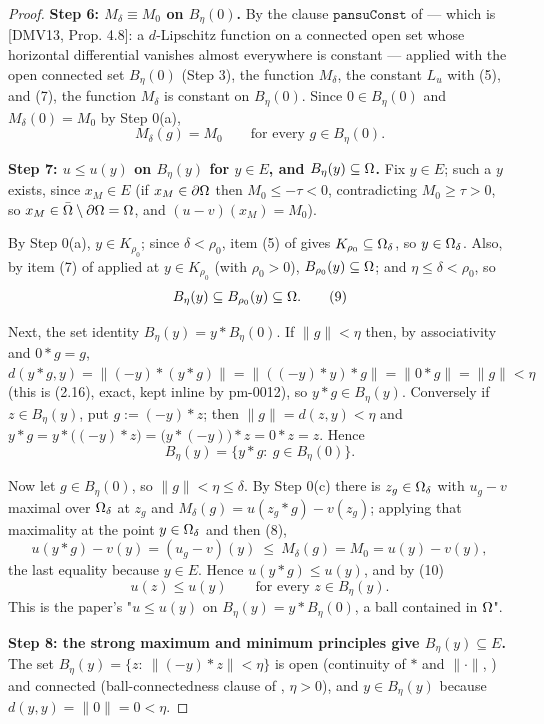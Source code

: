 \begin{proof}
\medskip\noindent\textbf{Step 6: $M_\delta\equiv M_0$ on $B_\eta(0)$.} By the clause
$\mathtt{pansuConst}$ of  --- which is [DMV13, Prop. 4.8]: a
$d$-Lipschitz function on a connected open set whose horizontal differential vanishes almost
everywhere is constant --- applied with the open connected set $B_\eta(0)$ (Step 3), the
function $M_\delta$, the constant $L_u$ with (5), and (7), the function $M_\delta$ is
constant on $B_\eta(0)$. Since $0\in B_\eta(0)$ and $M_\delta(0)=M_0$ by Step 0(a),
\[
 M_\delta(g)=M_0\qquad\text{for every } g\in B_\eta(0). \tag{8}
\]

\medskip\noindent\textbf{Step 7: $u\le u(y)$ on $B_\eta(y)$ for $y\in E$, and
$B_\eta(y)\subseteq\Omega$.} Fix $y\in E$; such a $y$ exists, since $x_M\in E$ (if
$x_M\in\partial\Omega$ then $M_0\le-\tau<0$, contradicting $M_0\ge\tau>0$, so
$x_M\in\bar{\Omega}\setminus\partial\Omega=\Omega$, and $(u-v)(x_M)=M_0$).

By Step 0(a), $y\in K_{\rho_0}$; since $\delta<\rho_0$, item (5) of
 gives $K_{\rho_0}\subseteq\Omega_\delta$, so $y\in\Omega_\delta$.
Also, by item (7) of  applied at $y\in K_{\rho_0}$ (with
$\rho_0>0$), $B_{\rho_0}(y)\subseteq\Omega$; and $\eta\le\delta<\rho_0$, so
\[
 B_\eta(y)\subseteq B_{\rho_0}(y)\subseteq\Omega . \tag{9}
\]

Next, the set identity $B_\eta(y)=y*B_\eta(0)$. If $\|g\|<\eta$ then, by associativity and
$0*g=g$, $d(y*g,y)=\|(-y)*(y*g)\|=\|((-y)*y)*g\|=\|0*g\|=\|g\|<\eta$ (this is
(2.16), exact, kept inline by pm-0012), so $y*g\in B_\eta(y)$. Conversely if
$z\in B_\eta(y)$, put $g:=(-y)*z$; then $\|g\|=d(z,y)<\eta$ and
$y*g=y*\big((-y)*z\big)=\big(y*(-y)\big)*z=0*z=z$. Hence
\[
 B_\eta(y)=\{y*g:\ g\in B_\eta(0)\} . \tag{10}
\]

Now let $g\in B_\eta(0)$, so $\|g\|<\eta\le\delta$. By Step 0(c) there is $z_g\in\Omega_\delta$
with $u_g-v$ maximal over $\Omega_\delta$ at $z_g$ and $M_\delta(g)=u(z_g*g)-v(z_g)$; applying
that maximality at the point $y\in\Omega_\delta$ and then (8),
\[
 u(y*g)-v(y)=(u_g-v)(y)\ \le\ M_\delta(g)=M_0=u(y)-v(y),
\]
the last equality because $y\in E$. Hence $u(y*g)\le u(y)$, and by (10)
\[
 u(z)\le u(y)\qquad\text{for every } z\in B_\eta(y). \tag{11}
\]
This is the paper's "$u\le u(y)$ on $B_\eta(y)=y*B_\eta(0)$, a ball contained in $\Omega$".

\medskip\noindent\textbf{Step 8: the strong maximum and minimum principles give
$B_\eta(y)\subseteq E$.} The set $B_\eta(y)=\{z:\ \|(-y)*z\|<\eta\}$ is open (continuity of
$*$ and $\|\cdot\|$, ) and connected (ball-connectedness clause of
, $\eta>0$), and $y\in B_\eta(y)$ because $d(y,y)=\|0\|=0<\eta$.


\end{proof}
